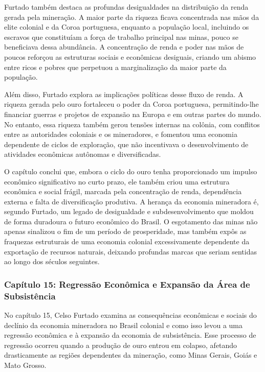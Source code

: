 \documentclass[a4paper,12pt]{article}[abntex2]
\begin{document}
Furtado também destaca as profundas desigualdades na distribuição da renda gerada pela mineração. A maior parte da riqueza ficava concentrada nas mãos da elite colonial e da Coroa portuguesa, enquanto a população local, incluindo os escravos que constituíam a força de trabalho principal nas minas, pouco se beneficiava dessa abundância. A concentração de renda e poder nas mãos de poucos reforçou as estruturas sociais e econômicas desiguais, criando um abismo entre ricos e pobres que perpetuou a marginalização da maior parte da população.

Além disso, Furtado explora as implicações políticas desse fluxo de renda. A riqueza gerada pelo ouro fortaleceu o poder da Coroa portuguesa, permitindo-lhe financiar guerras e projetos de expansão na Europa e em outras partes do mundo. No entanto, essa riqueza também gerou tensões internas na colônia, com conflitos entre as autoridades coloniais e os mineradores, e fomentou uma economia dependente de ciclos de exploração, que não incentivava o desenvolvimento de atividades econômicas autônomas e diversificadas.

O capítulo conclui que, embora o ciclo do ouro tenha proporcionado um impulso econômico significativo no curto prazo, ele também criou uma estrutura econômica e social frágil, marcada pela concentração de renda, dependência externa e falta de diversificação produtiva. A herança da economia mineradora é, segundo Furtado, um legado de desigualdade e subdesenvolvimento que moldou de forma duradoura o futuro econômico do Brasil. O esgotamento das minas não apenas sinalizou o fim de um período de prosperidade, mas também expôs as fraquezas estruturais de uma economia colonial excessivamente dependente da exportação de recursos naturais, deixando profundas marcas que seriam sentidas ao longo dos séculos seguintes.

\subsubsection{\textbf{Capítulo 15: Regressão Econômica e Expansão da Área de Subsistência}}

No capítulo 15, Celso Furtado examina as consequências econômicas e sociais do declínio da economia mineradora no Brasil colonial e como isso levou a uma regressão econômica e à expansão da economia de subsistência. Esse processo de regressão ocorreu quando a produção de ouro entrou em colapso, afetando drasticamente as regiões dependentes da mineração, como Minas Gerais, Goiás e Mato Grosso.
\end{document}
